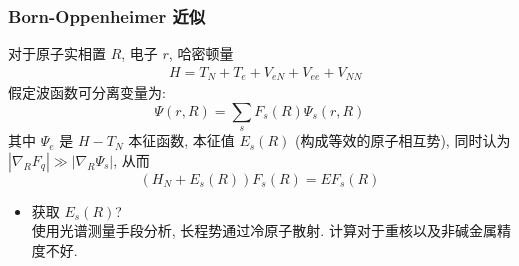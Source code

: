 \documentclass[10pt,a4paper,twocolumn]{article} %
\numberwithin{equation}{section} %
\begin{document}
\subsubsection{Born-Oppenheimer 近似} %
\label{subsub:born_oppenheimer}
对于原子实相置 $R$, 电子 $r$, 哈密顿量
\begin{equation}
	\begin{split}
		&H = T_N + T_e + V_{eN} + V_{ee} + V_{NN}
	\end{split}
\end{equation}
假定波函数可分离变量为: 
\begin{equation}
	\Psi(r, R) = \sum_s F_s(R)\Psi_{s}(r, R)
\end{equation}
其中 $\Psi_e$ 是 $H-T_N$ 本征函数, 本征值 $E_s(R)$ (构成等效的原子相互势), 
同时认为 $|\nabla_R F_q| \gg |\nabla_R \Psi_s|$, 从而
\begin{equation}
	(H_N + E_s(R)) F_s(R) = E F_s(R)
\end{equation}
\begin{itemize}
	\item 获取 $E_s(R)$? \\
	使用光谱测量手段分析, 长程势通过冷原子散射. 计算对于重核以及非碱金属精度不好.
\end{itemize}
\end{document}
